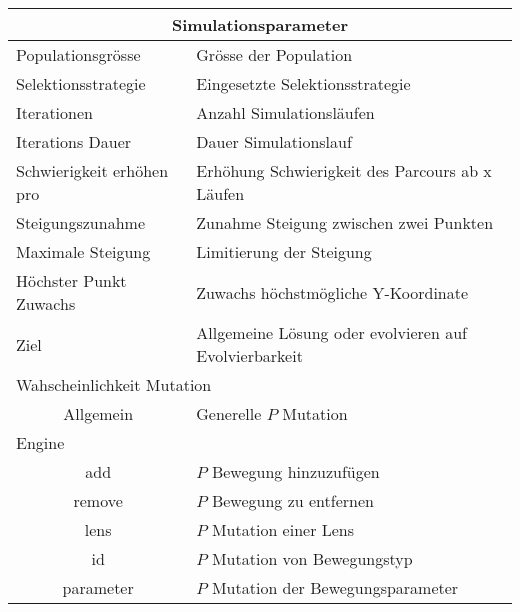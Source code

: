 
    \begin{tabular}{ | l | l | }
      \hline
      \multicolumn{2}{|c|}{Simulationsparameter} \\
      \hline
      Populationsgrösse & Grösse der Population \\ \hline
      Selektionsstrategie & Eingesetzte Selektionsstrategie \\ \hline
      Iterationen & Anzahl Simulationsläufen \\ \hline
      Iterations Dauer & Dauer Simulationslauf \\ \hline
      Schwierigkeit erhöhen pro & Erhöhung Schwierigkeit des Parcours ab x Läufen \\ \hline
      Steigungszunahme & Zunahme Steigung zwischen zwei Punkten \\ \hline
      Maximale Steigung & Limitierung der Steigung\\ \hline
      Höchster Punkt Zuwachs & Zuwachs höchstmögliche Y-Koordinate \\ \hline
      Ziel & Allgemeine Lösung oder evolvieren auf Evolvierbarkeit \\ \hline
      \multicolumn{2}{|l|}{Wahscheinlichkeit Mutation}\\ \hline
      \multicolumn{1}{|c|}{Allgemein} & Generelle \(P\) Mutation \\ \hline
      Engine &  \\ \hline
      \multicolumn{1}{|c|}{add} & \(P\) Bewegung hinzuzufügen \\ \hline
      \multicolumn{1}{|c|}{remove} & \(P\) Bewegung zu entfernen \\ \hline
      \multicolumn{1}{|c|}{lens} & \(P\) Mutation einer Lens \\ \hline
      \multicolumn{1}{|c|}{id} & \(P\) Mutation von Bewegungstyp\\ \hline
      \multicolumn{1}{|c|}{parameter} & \(P\) Mutation der Bewegungsparameter \\ \hline
    \end{tabular}
